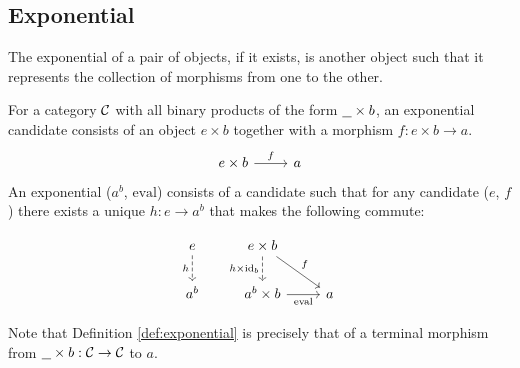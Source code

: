 \subsection{Exponential}
The exponential of a pair of objects, if it exists, is another object such that
it represents the collection of morphisms from one to the other.
\begin{definition}

  For a category $\mathcal{C}$ with all binary products of the form $\underline{\ \ }\times b$, an
  exponential candidate consists of an object $e\times b$ together with a morphism $f: e\times b\to a$.
  \[\begin{tikzcd}[ampersand replacement=\&]
    {e\times b} \& a
    \arrow["f", from=1-1, to=1-2]
  \end{tikzcd}\] An exponential ($a^b$, $\mathrm{eval}$) consists of a candidate
  such that for any candidate ($e$, $f$) there exists a unique $h:e\to a^b$ that
  makes the following commute:
  \parencite{awodey:category_theory}

  \[\begin{tikzcd}[ampersand replacement=\&]
    e \& {e\times b} \\
    {a^b} \& {a^b\times b} \& a
    \arrow["{\mathrm{eval}}"', from=2-2, to=2-3]
    \arrow["{h\times\id_b}"', dashed, from=1-2, to=2-2]
    \arrow["f", from=1-2, to=2-3]
    \arrow["h"', dashed, from=1-1, to=2-1]
  \end{tikzcd}\]
\end{definition}

\begin{remark}
  Note that Definition \ref{def:exponential} is precisely that of a terminal
  morphism from $\underline{\ \ }\times b: \mathcal{C}\to \mathcal{C}$ to $a$.
\end{remark}